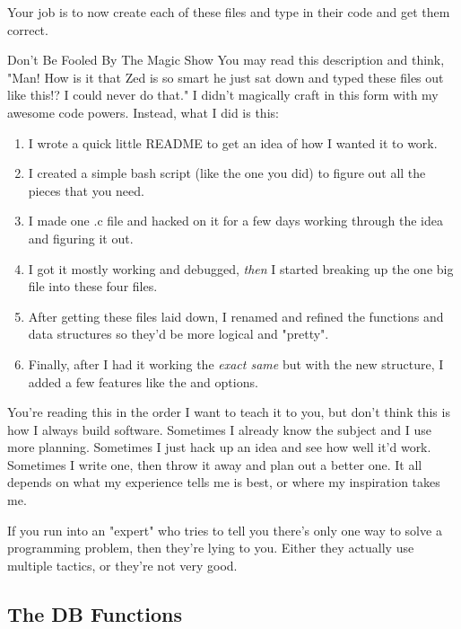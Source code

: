 Your job is to now create each of these files and type in their code
and get them correct.

\begin{aside}{Don't Be Fooled By The Magic Show}
You may read this description and think, "Man! How is it that Zed is
so smart he just sat down and typed these files out like this!? I
could never do that."  I didn't magically craft  
in this form with my awesome code powers.  Instead, what I did is this:

\begin{enumerate}
\item I wrote a quick little README to get an idea of how I wanted it
    to work.
\item I created a simple bash script (like the one you did) to figure
    out all the pieces that you need.
\item I made one .c file and hacked on it for a few days working through
    the idea and figuring it out.
\item I got it mostly working and debugged, \emph{then} I started
    breaking up the one big file into these four files.
\item After getting these files laid down, I renamed and refined the
    functions and data structures so they'd be more logical and "pretty".
\item Finally, after I had it working the \emph{exact same} but with
    the new structure, I added a few features like the  and
     options.
\end{enumerate}

You're reading this in the order I want to teach it to you, but don't think
this is how I always build software.  Sometimes I already know the subject and
I use more planning.  Sometimes I just hack up an idea and see how well it'd
work.  Sometimes I write one, then throw it away and plan out a better one.  It
all depends on what my experience tells me is best, or where my inspiration
takes me.

If you run into an "expert" who tries to tell you there's only one
way to solve a programming problem, then they're lying to you.  Either
they actually use multiple tactics, or they're not very good.
\end{aside}

\subsection{The DB Functions}

